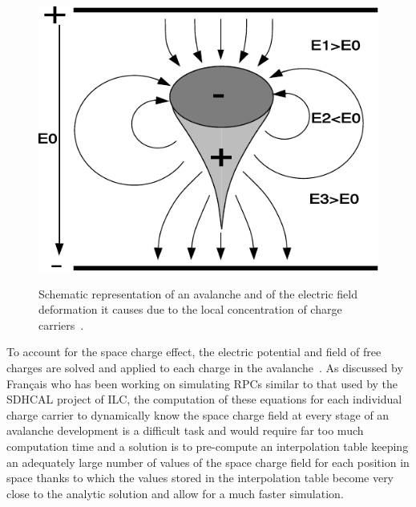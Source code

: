 	\begin{figure}[H]
		\centering
		\includegraphics[width = 0.7\plotwidth]{fig/chapt4/Avalanche_space_charge.pdf}\\
		\caption{\label{fig:Space_charge} Schematic representation of an avalanche and of the electric field deformation it causes due to the local concentration of charge carriers~\cite{LIPPMANN2003}.}
	\end{figure}
	
	To account for the space charge effect, the electric potential and field of free charges are solved and applied to each charge in the avalanche~\cite{LIPPMANN2003,VINCENT2017}. As discussed by Français who has been working on simulating RPCs similar to that used by the SDHCAL project of ILC, the computation of these equations for each individual charge carrier to dynamically know the space charge field at every stage of an avalanche development is a difficult task and would require far too much computation time and a solution is to pre-compute an interpolation table keeping an adequately large number of values of the space charge field for each position in space thanks to which the values stored in the interpolation table become very close to the analytic solution and allow for a much faster simulation.\\
	
